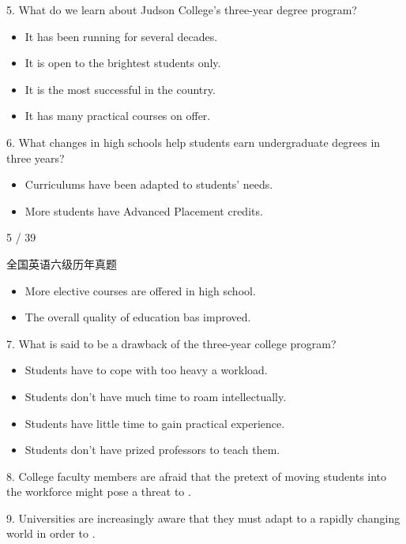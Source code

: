 \documentclass[UTF8,11pt]{ctexart}
\begin{document}
5. What do we learn about Judson College’s three-year degree program?


\begin{itemize}[leftmargin=2em,itemsep=.2em,topsep=.4em]\item[A.] It has been running for several decades.
\item[B.] It is open to the brightest students only.
\item[C.] It is the most successful in the country.
\item[D.] It has many practical courses on offer.
\end{itemize}

6. What changes in high schools help students earn undergraduate degrees in three years?


\begin{itemize}[leftmargin=2em,itemsep=.2em,topsep=.4em]\item[A.] Curriculums have been adapted to students’ needs.
\item[B.] More students have Advanced Placement credits.
\end{itemize}

5 / 39


全国英语六级历年真题


\begin{itemize}[leftmargin=2em,itemsep=.2em,topsep=.4em]\item[C.] More elective courses are offered in high school.
\item[D.] The overall quality of education bas improved.
\end{itemize}

7. What is said to be a drawback of the three-year college program?


\begin{itemize}[leftmargin=2em,itemsep=.2em,topsep=.4em]\item[A.] Students have to cope with too heavy a workload.
\item[B.] Students don’t have much time to roam intellectually.
\item[C.] Students have little time to gain practical experience.
\item[D.] Students don’t have prized professors to teach them.
\end{itemize}

8. College faculty members are afraid that the pretext of moving students into the workforce might pose a threat to .


9. Universities are increasingly aware that they must adapt to a rapidly changing world in order to .
\end{document}
